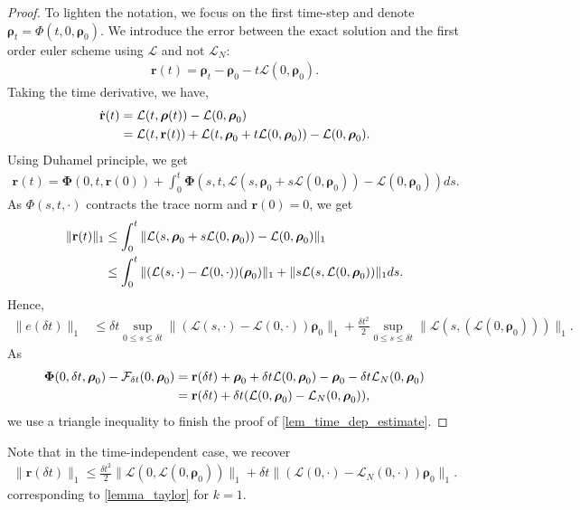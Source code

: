 \documentclass[a4paper,onecolumn,amsmath,amssymb,amsfonts,accepted=2026-03-06]{quantumarticle}
\newcommand{\xL}{\mathcal{L}}
\newcommand{\xF}{\mathcal{F}}
\begin{document}
\begin{proof}
    To lighten the notation, we focus on the first time-step and denote $\boldsymbol{\rho}_t=\Phi(t,0,\boldsymbol{\rho}_0)$. We introduce the error between the exact solution and the first order euler scheme using $\xL$ and not $\xL_N$:
    \begin{align}
        \mathbf{r}(t)=\boldsymbol{\rho}_{t}-\boldsymbol{\rho}_{0} -t \xL(0,\boldsymbol{\rho}_0).
    \end{align}
    Taking the time derivative, we have,
    \begin{align}
        \notag \dot{\mathbf{r}}(t)&=\xL(t,\boldsymbol{\rho}(t))-\xL(0,\boldsymbol{\rho}_0)\\
        &=\xL(t,\mathbf{r}(t) ) + \xL(t, \boldsymbol{\rho}_0+ t \xL(0,\boldsymbol{\rho}_0))-\xL(0,\boldsymbol{\rho}_0).
    \end{align}
    Using Duhamel principle, we get
    \begin{align}
        \mathbf{r}(t)=\boldsymbol{\Phi}(0,t,\mathbf{r}(0))+\int_0^t\boldsymbol{\Phi}(s,t,\xL(s, \boldsymbol{\rho}_0+ s \xL(0,\boldsymbol{\rho}_0))-\xL(0,\boldsymbol{\rho}_0)) ds.
    \end{align}
    As $\Phi(s,t,\cdot)$ contracts the trace norm and $\mathbf{r}(0)=0$, we get
    \begin{align}
        \notag \|\mathbf{r}(t)\|_1 &\leq \int_0^t \|\xL(s, \boldsymbol{\rho}_0 + s \xL(0,\boldsymbol{\rho}_0))-\xL(0,\boldsymbol{\rho}_0)\|_1\\
        &\leq \int_0^t \|(\xL(s,\cdot)-\xL(0,\cdot))(\boldsymbol{\rho}_0)\|_1 + \|s \xL(s,\xL(0,\boldsymbol{\rho}_0))\|_1 ds.
    \end{align}
    Hence,
    \begin{align}
        \|e(\delta t)\|_1 &\leq\delta t \sup_{0 \leq s \leq \delta t} \| (\xL(s,\cdot)-\xL(0,\cdot))\boldsymbol{\rho}_0\|_1 + \frac{\delta t ^2}{2} \sup_{0 \leq s \leq \delta t} \|\xL(s,(\xL(0,\boldsymbol{\rho}_0)))\|_1.
    \end{align}
    As 
    \begin{align}
        \notag \boldsymbol{\Phi}(0,\delta t,\boldsymbol{\rho}_0)- \xF_{\delta t}(0,\boldsymbol{\rho}_0)&=\mathbf{r}(\delta t)+\boldsymbol{\rho}_0 + \delta t \xL(0,\boldsymbol{\rho}_0)- \boldsymbol{\rho}_0 - \delta t \xL_N(0,\boldsymbol{\rho}_0)\\
        &=\mathbf{r}(\delta t) + \delta t(\xL(0,\boldsymbol{\rho}_0)-\xL_N(0,\boldsymbol{\rho}_0)),
    \end{align}
    we use a triangle inequality to finish the proof of \cref{lem_time_dep_estimate}.
\end{proof}
Note that in the time-independent case, we recover 
\begin{align}
\|\mathbf{r}(\delta t)\|_1 \leq \frac{\delta t^2}{2} \|\xL(0,\xL(0,\boldsymbol{\rho}_0))\|_1+\delta t \|(\xL(0,\cdot)-\xL_N(0,\cdot))\boldsymbol{\rho}_0\|_1.
\end{align}
corresponding to \cref{lemma_taylor} for $k=1$.
\end{document}
